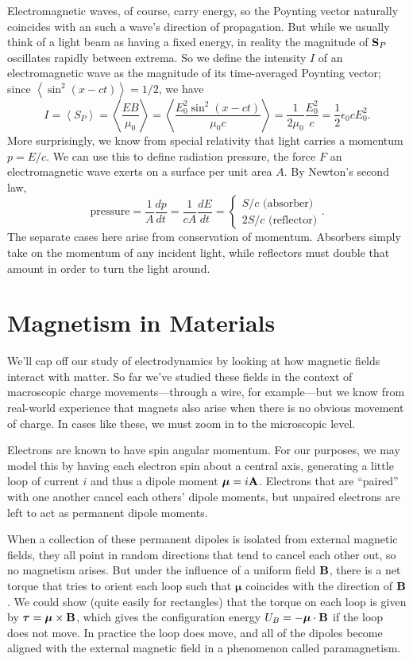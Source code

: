 \documentclass[../p051main.tex]{subfiles}
\begin{document}
Electromagnetic waves, of course, carry energy, so the Poynting vector naturally coincides with an such a wave's direction of propagation.
But while we usually think of a light beam as having a fixed energy, in reality the magnitude of $\mathbf{S}_P$ oscillates rapidly between extrema.
So we define the intensity $I$ of an electromagnetic wave as the magnitude of its time-averaged Poynting vector; since $\left< \sin^2 (x - ct) \right> = 1 / 2$, we have
\[ I = \left< S_P \right> = \left< \frac{EB}{\mu_0} \right> = \left< \frac{E_0^2 \sin^2(x - ct)}{\mu_0c} \right> = \frac{1}{2\mu_0} \frac{E_0^2}{c} = \frac{1}{2} \epsilon_0 cE_0^2. \]
More surprisingly, we know from special relativity that light carries a momentum $p = E / c$.
We can use this to define radiation pressure, the force $F$ an electromagnetic wave exerts on a surface per unit area $A$.
By Newton's second law,
\[ \textrm{pressure} = \frac{1}{A} \frac{dp}{dt} = \frac{1}{cA} \frac{dE}{dt} = \begin{cases} S / c \textrm{ (absorber)} \\ 2S / c \textrm{ (reflector)} \end{cases}. \]
The separate cases here arise from conservation of momentum.
Absorbers simply take on the momentum of any incident light, while reflectors must double that amount in order to turn the light around.

\section{Magnetism in Materials}
We'll cap off our study of electrodynamics by looking at how magnetic fields interact with matter.
So far we've studied these fields in the context of macroscopic charge movements---through a wire, for example---but we know from real-world experience that magnets also arise when there is no obvious movement of charge.
In cases like these, we must zoom in to the microscopic level.

Electrons are known to have spin angular momentum.
For our purposes, we may model this by having each electron spin about a central axis, generating a little loop of current $i$ and thus a dipole moment $\boldsymbol{\mu} = i\mathbf{A}$.
Electrons that are ``paired'' with one another cancel each others' dipole moments, but unpaired electrons are left to act as permanent dipole moments.

When a collection of these permanent dipoles is isolated from external magnetic fields, they all point in random directions that tend to cancel each other out, so no magnetism arises.
But under the influence of a uniform field $\mathbf{B}$, there is a net torque that tries to orient each loop such that $\boldsymbol{\mu}$ coincides with the direction of $\mathbf{B}$.
We could show (quite easily for rectangles) that the torque on each loop is given by $\boldsymbol{\tau} = \boldsymbol{\mu} \times \mathbf{B}$, which gives the configuration energy $U_B = -\boldsymbol{\mu} \cdot \mathbf{B}$ if the loop does not move.
In practice the loop does move, and all of the dipoles become aligned with the external magnetic field in a phenomenon called paramagnetism.
\end{document}
